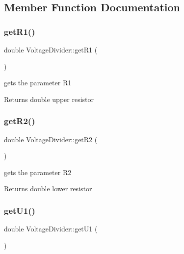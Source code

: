 \subsection{Member Function Documentation}
\mbox{\label{classVoltageDivider_ac9928564fe59e40e12346222a7eb82a2}} 
\subsubsection{\texorpdfstring{get\+R1()}{getR1()}}
{\footnotesize\ttfamily double Voltage\+Divider\+::get\+R1 (\begin{DoxyParamCaption}{ }\end{DoxyParamCaption})}



gets the parameter R1 

\begin{DoxyReturn}{Returns}
double upper resistor 
\end{DoxyReturn}
\mbox{\label{classVoltageDivider_aa83138c075ea0b37a20d65e4d7cc068b}} 
\subsubsection{\texorpdfstring{get\+R2()}{getR2()}}
{\footnotesize\ttfamily double Voltage\+Divider\+::get\+R2 (\begin{DoxyParamCaption}{ }\end{DoxyParamCaption})}



gets the parameter R2 

\begin{DoxyReturn}{Returns}
double lower resistor 
\end{DoxyReturn}
\mbox{\label{classVoltageDivider_a36ab249dd0f1e5cb7b055affd249af6c}} 
\subsubsection{\texorpdfstring{get\+U1()}{getU1()}}
{\footnotesize\ttfamily double Voltage\+Divider\+::get\+U1 (\begin{DoxyParamCaption}{ }\end{DoxyParamCaption})}



